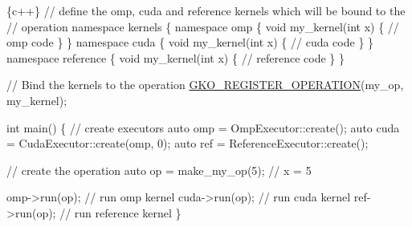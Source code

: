 \begin{DoxyCode}
\{c++\}
\textcolor{comment}{// define the omp, cuda and reference kernels which will be bound to the}
\textcolor{comment}{// operation}
\textcolor{keyword}{namespace }kernels \{
\textcolor{keyword}{namespace }omp \{
\textcolor{keywordtype}{void} my\_kernel(\textcolor{keywordtype}{int} x) \{
     \textcolor{comment}{// omp code}
\}
\}
\textcolor{keyword}{namespace }cuda \{
\textcolor{keywordtype}{void} my\_kernel(\textcolor{keywordtype}{int} x) \{
     \textcolor{comment}{// cuda code}
\}
\}
\textcolor{keyword}{namespace }reference \{
\textcolor{keywordtype}{void} my\_kernel(\textcolor{keywordtype}{int} x) \{
    \textcolor{comment}{// reference code}
\}
\}

\textcolor{comment}{// Bind the kernels to the operation}
\hyperlink{group__Executor_ga7f2c119ff9f4f51c7f8e2d5dbbbbd044}{GKO\_REGISTER\_OPERATION}(my\_op, my\_kernel);

\textcolor{keywordtype}{int} main() \{
    \textcolor{comment}{// create executors}
    \textcolor{keyword}{auto} omp = OmpExecutor::create();
    \textcolor{keyword}{auto} cuda = CudaExecutor::create(omp, 0);
    \textcolor{keyword}{auto} ref = ReferenceExecutor::create();

    \textcolor{comment}{// create the operation}
    \textcolor{keyword}{auto} op = make\_my\_op(5); \textcolor{comment}{// x = 5}

    omp->run(op);  \textcolor{comment}{// run omp kernel}
    cuda->run(op);  \textcolor{comment}{// run cuda kernel}
    ref->run(op);  \textcolor{comment}{// run reference kernel}
\}
\end{DoxyCode}
 